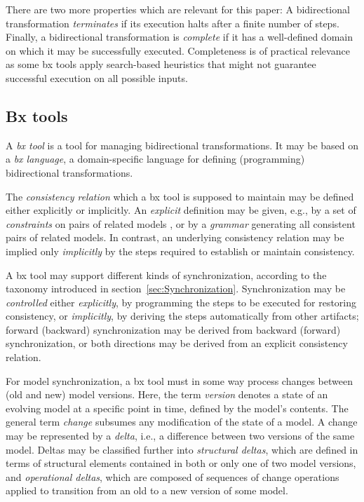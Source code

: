 There are two more properties which are relevant for this paper: A bidirectional transformation \emph{terminates} if its execution halts after a finite number of steps. 
Finally, a bidirectional transformation is \emph{complete} if it has a well-defined domain on which it may be successfully executed.
Completeness is of practical relevance as some bx tools apply search-based heuristics that might not guarantee successful execution on all possible inputs.

\subsection{Bx tools}
\label{sec:BxTools}

A \emph{bx tool} is a tool for managing bidirectional transformations. It may be based on a \emph{bx language}, a domain-specific language for defining (programming) bidirectional transformations. 

The \emph{consistency relation} which a bx tool is supposed to maintain may be defined either explicitly or implicitly. An \emph{explicit} definition may be given, e.g., by a set of \emph{constraints} on pairs of related models \cite{QVT-1.3}, or by a \emph{grammar} \cite{Schurr1994} generating all consistent pairs of related models. 
In contrast, an underlying consistency relation may be implied only \emph{implicitly} by the steps required to establish or maintain consistency.

A bx tool may support different kinds of synchronization, according to the taxonomy introduced in section~\ref{sec:Synchronization}. 
Synchronization may be \emph{controlled} either \emph{explicitly}, by programming the steps to be executed for restoring consistency, or \emph{implicitly}, by deriving the steps automatically from other artifacts; forward (backward) synchronization may be derived from backward (forward) synchronization, or both directions may be derived from an explicit  consistency relation.

For model synchronization, a bx tool must in some way process changes between (old and new) model versions. Here, the term \emph{version} denotes a state of an evolving model at a specific point in time, defined by the model's contents. 
The general term \emph{change} subsumes any modification of the state of a model. 
A change may be represented by a \emph{delta}, i.e., a difference between two versions of the same model. 
Deltas may be classified further into \emph{structural deltas}, which are defined in terms of structural elements contained in both or only one of two model versions, and \emph{operational deltas}, which are composed of sequences of change operations applied to transition from an old to a new version of some model.

